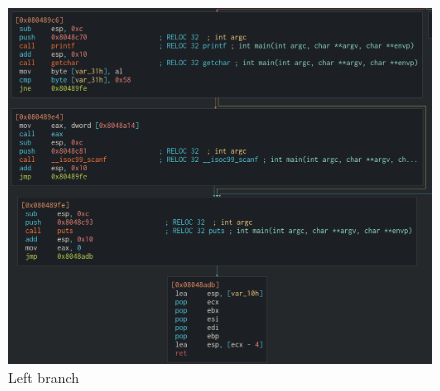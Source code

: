 \documentclass[11pt]{article}
\begin{document}
\begin{figure}[htbp]
\centering
\includegraphics[width=.9\linewidth]{boms_landed_left.png}
\caption{\label{fig-left-branch}Left branch}
\end{figure}
\end{document}
